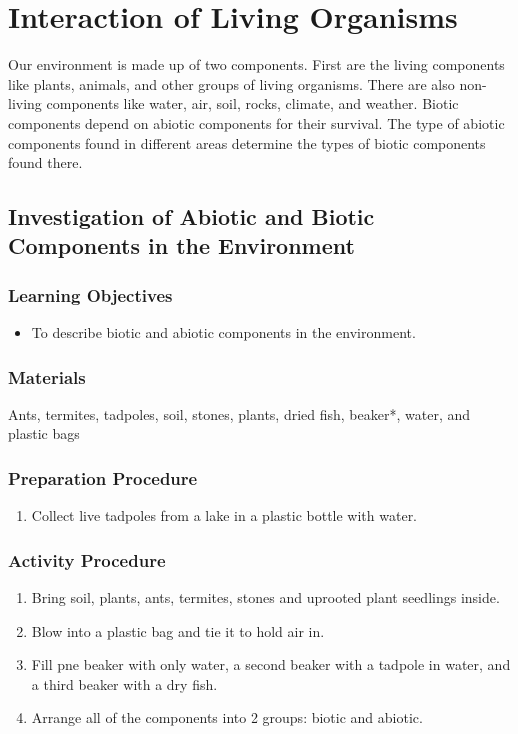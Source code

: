 \section{Interaction of Living Organisms}
Our environment is made up of two components. First are the living components like plants, animals, and other groups of living organisms. There are also non-living components like water, air, soil, rocks, climate, and weather. Biotic components depend on abiotic components for their survival. The type of abiotic components found in different areas determine the types of biotic components found there.

\subsection{Investigation of Abiotic and Biotic Components in the Environment}

\subsubsection*{Learning Objectives}
\begin{itemize}
\item{To describe biotic and abiotic components in the environment.}
\end{itemize}

\subsubsection*{Materials}
Ants, termites, tadpoles, soil, stones, plants, dried fish, beaker*, water, and plastic bags

\subsubsection*{Preparation Procedure}
\begin{enumerate}
\item{Collect live tadpoles from a lake in a plastic bottle with water.}
\end{enumerate}

\subsubsection*{Activity Procedure}
\begin{enumerate}
\item{Bring soil, plants, ants, termites, stones and uprooted plant seedlings inside.}
\item{Blow into a plastic bag and tie it to hold air in.}
\item{Fill pne beaker with only water, a second beaker with a tadpole in water, and a third beaker with a dry fish.}
\item{Arrange all of the components into 2 groups: biotic and abiotic.}
\end{enumerate}

